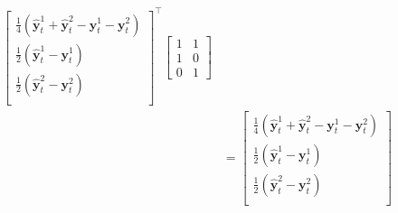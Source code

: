 \documentclass[preprint, 3p, times, twocolumn]{elsarticle}
\begin{document}
\begin{align}
\begin{bmatrix}
     \frac{1}{4}(\hat{\textbf{y}}^1_{t} + \hat{\textbf{y}}^2_{t} - \textbf{y}^1_{t} - \textbf{y}^2_{t}) \\
     \frac{1}{2}(\hat{\textbf{y}}^1_{t} - \textbf{y}^1_{t}) \\
     \frac{1}{2}(\hat{\textbf{y}}^2_{t} - \textbf{y}^2_{t}) \\
   \end{bmatrix}^\intercal
   \begin{bmatrix}
     1 &1 \\
     1 &0 \\
     0 &1
   \end{bmatrix} \\
  &=
    \begin{bmatrix}
      \frac{1}{4}(\hat{\textbf{y}}^1_{t} + \hat{\textbf{y}}^2_{t} - \textbf{y}^1_{t} - \textbf{y}^2_{t}) \\
      \frac{1}{2}(\hat{\textbf{y}}^1_{t} - \textbf{y}^1_{t}) \\
      \frac{1}{2}(\hat{\textbf{y}}^2_{t} - \textbf{y}^2_{t}) \\
    \end{bmatrix}   
\end{align}  
  
  
  











\end{document}
